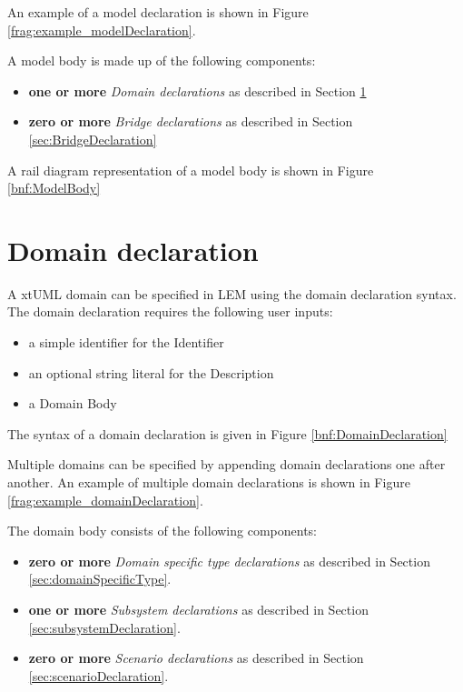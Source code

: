 An example of a model declaration is shown in Figure \ref{frag:example_modelDeclaration}.


A model body is made up of the following components:
\begin{itemize}
\item \textbf{one or more} \textit{Domain declarations} as described in Section \ref{sec:DomainDeclaration}
\item \textbf{zero or more} \textit{Bridge declarations} as described in Section \ref{sec:BridgeDeclaration}
\end{itemize}

A rail diagram representation of a model body is shown in Figure \ref{bnf:ModelBody}


\section{Domain declaration}\label{sec:DomainDeclaration}
A xtUML domain can be specified in LEM using the domain declaration syntax. The domain declaration requires the following user inputs:

\begin{itemize}
\item a simple identifier for the Identifier
\item an optional string literal for the Description
\item a Domain Body
\end{itemize}

The syntax of a domain declaration is given in Figure \ref{bnf:DomainDeclaration}

Multiple domains can be specified by appending domain declarations one after
another. An example of multiple domain declarations is shown in Figure
\ref{frag:example_domainDeclaration}.


The domain body consists of the following components:
\begin{itemize}
\item \textbf{zero or more} \textit{Domain specific type declarations} as described in Section \ref{sec:domainSpecificType}.
\item \textbf{one or more} \textit{Subsystem declarations} as described in Section \ref{sec:subsystemDeclaration}.
\item \textbf{zero or more} \textit{Scenario declarations} as described in Section \ref{sec:scenarioDeclaration}.
\end{itemize}


